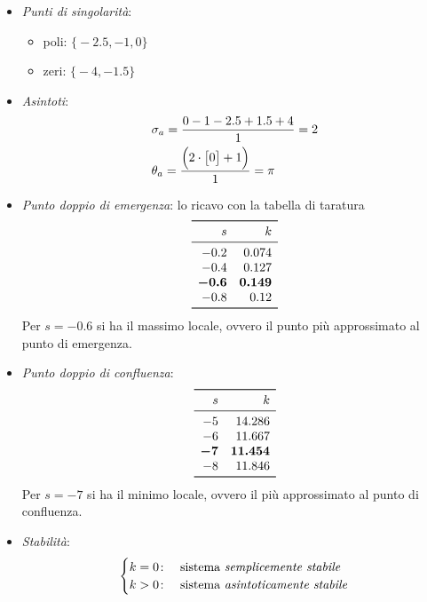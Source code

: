 \begin{esercizio}
\begin{itemize}
	\item \emph{Punti di singolarità}:
		\begin{itemize}
			\item poli: \(\bigl\{ -2.5, -1, 0 \bigr\}\)
			\item zeri: \(\bigl\{ -4, -1.5 \bigr\}\)
		\end{itemize}
	\item \emph{Asintoti}:
		\begin{align*}
			& \sigma_a = \frac{0-1-2.5+1.5+4}{1} = 2 \\
			& \theta_a = \frac{\Bigl( 2 \cdot \bigl[0\bigr] +1 \Bigl)}{1} = \pi
		\end{align*}
	\item \emph{Punto doppio di emergenza}:
		lo ricavo con la tabella di taratura
		\[\begin{array}{rr}
			\toprule
			s & k \\
			\midrule
			-0.2 & 0.074 \\
			-0.4 & 0.127 \\
			\bm{-0.6} & \bm{0.149} \\
			-0.8 & 0.12 \\
			\bottomrule
		\end{array}\]
		Per \(s = -0.6\) si ha il massimo locale, ovvero il punto più
		approssimato al punto di emergenza.
	\item \emph{Punto doppio di confluenza}:
		\[\begin{array}{rr}
			\toprule
			s & k \\
			\midrule
			-5 & 14.286 \\
			-6 & 11.667 \\
			\bm{-7} & \bm{11.454} \\
			-8 & 11.846 \\
			\bottomrule
		\end{array}\]
		Per \(s = -7\) si ha il minimo locale, ovvero il più approssimato
		al punto di confluenza.
	\item \emph{Stabilità}:
		\[\begin{cases}
			k = 0\colon & \text{sistema \emph{semplicemente stabile}} \\
			k > 0\colon & \text{sistema \emph{asintoticamente stabile}}
		\end{cases}\]
\end{itemize}
\end{esercizio}

